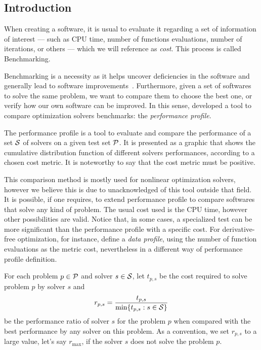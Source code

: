 \subsection*{Introduction}

    When creating a software, it is usual to evaluate it regarding a set of
    information of interest
    --- such as CPU time, number of
    functions evaluations, number of iterations, or others --- which we will
    reference as \emph{cost}. This process is called Benchmarking.

    Benchmarking is a necessity as it
    helps uncover deficiencies in the software and generally lead
    to software
    improvements~\cite{url:mittelmann,Mittelmann:1999fb,Dolan:2006kl}.
    Furthermore, given a set of softwares to solve the same problem, we want to
    compare them to choose the best one, or verify how our own software can be
    improved.
    In this sense, \textcite{Dolan:2002du} developed a tool to compare
    optimization solvers benchmarks: the \emph{performance profile}.

    The performance profile is a tool to evaluate and compare the performance
    of a set $\mathcal{S}$ of solvers  on a given test set $\mathcal{P}$. It is presented as
    a graphic that shows the cumulative distribution function of different 
    solvers performances, according to a chosen cost metric.
    It is noteworthy to say that the cost metric must be positive.

    This comparison method is mostly used for nonlinear optimization solvers, 
    however we believe this is due to unacknowledged of this tool outside that
    field.
    It is possible, if one requires, to extend performance profile to compare  
    softwares that solve any kind of problem.  The usual cost used is the CPU 
    time, however other possibilities are valid.  Notice that, in some cases, a
    specialized test can be more significant than the performance profile with
    a specific cost.  For derivative-free optimization, for instance,
    \textcite{More:2009benchmarking} define a \emph{data profile}, using the
    number of function evaluations as the metric cost, nevertheless in a 
    different way of performance profile definition.

    For each
    problem $p \in \mathcal{P}$ and solver $s \in \mathcal{S}$, let $t_{p,s}$ be the
    cost required to solve problem $p$ by solver $s$ and
    \begin{align*}
      r_{p,s} = \frac{t_{p,s}}{\min\{t_{p,s}: s \in \mathcal{S}\}}
    \end{align*}
    be the performance ratio of solver $s$ for the problem $p$ when compared
    with the best performance by any solver on this problem.
    As a convention, we set $r_{p,s}$ to a large value, let's say $r_{\max}$, if
    the solver $s$ does not solve the problem $p$.

